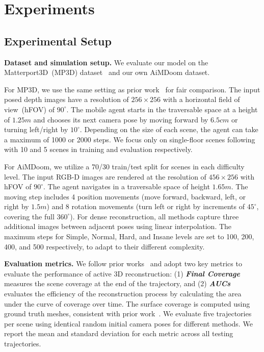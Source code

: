
\section{Experiments}

\subsection{Experimental Setup}

\noindent \textbf{Dataset and simulation setup.} 
%
We evaluate our model on the Matterport3D~(MP3D) dataset~\citep{Matterport3D} and our own AiMDoom dataset.

For MP3D, we use the same setting as prior work~\citep{yan2023active} for fair comparison. The input posed depth images have a resolution of $256 \times 256$ with a horizontal field of view~(hFOV) of $90^\circ$. 
The mobile agent starts in the traversable space at a height of $1.25m$ and chooses its next camera pose by moving forward by $6.5cm$ or turning left/right by $10^\circ$. 
Depending on the size of each scene, the agent can take a maximum of 1000 or 2000 steps. 
We focus only on single-floor scenes following \cite{yan2023active}  with 10 and 5 scenes in training and evaluation respectively.

For AiMDoom, we utilize a 70/30 train/test split for scenes in each difficulty level. 
The input RGB-D images are rendered at the resolution of $456 \times 256$ with hFOV of $90^\circ$.
The agent navigates in a traversable space of height $1.65m$.
The moving step includes 4 position movements (move forward, backward, left, or right by $1.5m$) and 8 rotation movements (turn left or right by increments of $45^\circ$, covering the full $360^\circ$).
For dense reconstruction, all methods capture three additional images between adjacent poses using linear interpolation.
The maximum steps for Simple, Normal, Hard, and Insane levels are set to 100, 200, 400, and 500 respectively, to adapt to their different complexity. 



    
\noindent \textbf{Evaluation metrics.}
%
We follow prior works~\citep{chen2024gennbv,guedon2023macarons} and adopt two key metrics to evaluate the performance of active 3D reconstruction:
(1) \textbf{\textit{Final Coverage}} measures the scene coverage at the end of the trajectory,
and (2) \textbf{\textit{AUCs}} evaluates the efficiency of the reconstruction process by calculating the area under the curve of coverage over time.
The surface coverage is computed using ground truth meshes, consistent with prior work~\citep{guedon2023macarons}. %
We evaluate five trajectories per scene using identical random initial camera poses for different methods. 
We report the mean and standard deviation for each metric across all testing trajectories.

